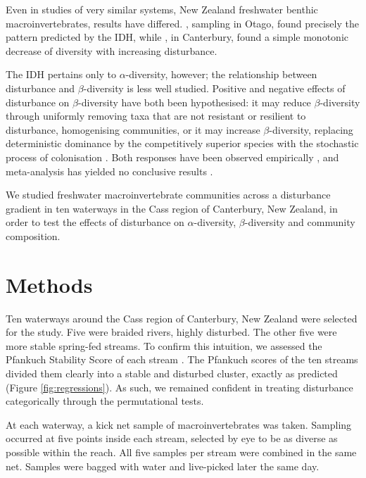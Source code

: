 \documentclass[a4paper,10pt]{article}
\begin{document}
Even in studies of very similar systems, New Zealand freshwater benthic macroinvertebrates, results have differed.
\textcite{idh-refugia-streams}, sampling in Otago, found precisely the pattern predicted by the IDH, while \textcite{diversity-stability-canterbury}, in Canterbury, found a simple monotonic decrease of diversity with increasing disturbance.

The IDH pertains only to $\alpha$-diversity, however; the relationship between disturbance and $\beta$-diversity is less well studied.
Positive and negative effects of disturbance on $\beta$-diversity have both been hypothesised:
it may reduce $\beta$-diversity through uniformly removing taxa that are not resistant or resilient to disturbance, homogenising communities,
or it may increase $\beta$-diversity, replacing deterministic dominance by the competitively superior species with the stochastic process of colonisation \parencite{disturbance-beta-meta}.
Both responses have been observed empirically \parencite{disturbance-increase-beta, homogenisation-agriculture}, and meta-analysis has yielded no conclusive results \parencite{disturbance-beta-meta}.

We studied freshwater macroinvertebrate communities across a disturbance gradient in ten waterways in the Cass region of Canterbury, New Zealand, in order to test the effects of disturbance on $\alpha$-diversity, $\beta$-diversity and community composition.

\section*{Methods}

Ten waterways around the Cass region of Canterbury, New Zealand were selected for the study.
Five were braided rivers, highly disturbed.
The other five were more stable spring-fed streams.
To confirm this intuition, we assessed the Pfankuch Stability Score of each stream \parencite{pfankuch, pfankuch-doc}.
The Pfankuch scores of the ten streams divided them clearly into a stable and disturbed cluster, exactly as predicted (Figure \ref{fig:regressions}).
As such, we remained confident in treating disturbance categorically through the permutational tests.

At each waterway, a kick net sample of macroinvertebrates was taken.
Sampling occurred at five points inside each stream, selected by eye to be as diverse as possible within the reach.
All five samples per stream were combined in the same net.
Samples were bagged with water and live-picked later the same day.
\end{document}
